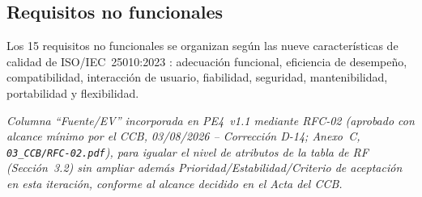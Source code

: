 \documentclass[11pt,a4paper]{article}
\begin{document}
\subsection{Requisitos no funcionales}
Los 15 requisitos no funcionales se organizan según las nueve características de calidad de ISO/IEC~25010:2023 \cite{iso25010}: adecuación funcional, eficiencia de desempeño, compatibilidad, interacción de usuario, fiabilidad, seguridad, mantenibilidad, portabilidad y flexibilidad.

\textit{Columna ``Fuente/EV'' incorporada en PE4~v1.1 mediante RFC-02 (aprobado con alcance mínimo por el CCB, 03/08/2026 -- Corrección D-14; Anexo~C, \texttt{03\_CCB/RFC-02.pdf}), para igualar el nivel de atributos de la tabla de RF (Sección~3.2) sin ampliar además Prioridad/Estabilidad/Criterio de aceptación en esta iteración, conforme al alcance decidido en el Acta del CCB.}
\end{document}
